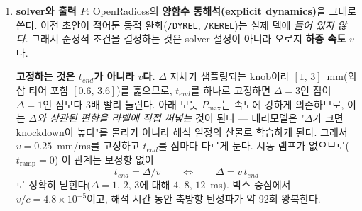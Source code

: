 \documentclass[11pt]{article}
\begin{document}
\begin{enumerate}
      비교 기준으로 쓰는 고전 임계값은 (선형 Donnell 이론, $\nu{=}0.3$)
      \[
        P_{cr} = 3.80276\,E\,t^2, \qquad
        \sigma_{cr} = 0.60523\,\frac{E\,t}{R}, \qquad
        d_{cr} = 0.60523\,\frac{t\,L}{R}
      \]
      이다. $P_{cr}$에서 $R$과 $L$이 정확히 상쇄된다는 점에 주의 --- 임계
      \emph{하중}은 두께만의 함수다. 설계 박스에서 $P_{cr}$은 798.6~kN
      ($t{=}1.0$)에서 3194.3~kN($t{=}2.0$)까지, 외삽 티어까지 포함하면
      511--4600~kN 범위다. 진단용 무차원수 $\lambda = \Delta/d_{cr}$는
      $0.44$--$3.49$에 분포한다. $\lambda$는 어디까지나 사후 진단량이고,
      샘플링을 좌우하지 않는다 --- 다섯 knob이 독립이므로 $\lambda$를 조건으로
      걸어 표본을 자르지 않는다.

      그 대가를 분명히 적어둔다: \textbf{모든 draw가 좌굴하지는 않는다}.
      학습 티어 draw의 16.7\%(25개 설계점, 1600 draw)가 $\lambda < 1$이고,
      39.3\%가 $\lambda < 1.2$다. 이런 draw는 부과한 스트로크가 끝날 때까지
      상승하는 탄성 경로 위에 머물러서, $P_{\max}$가 한계점 하중이 아니라
      \emph{스트로크 끝단의 하중}이다. 결정적으로 그 값은 \textbf{결함과
      무관하다} --- $\Delta{=}0.6$에서 서로 다른 딤플 draw 두 개가 비트 단위로
      동일한 $P_{\max}/P_{cr} = 0.442$를 돌려주었다. 따라서 이 경우
      $P_{\max}/P_{cr}$은 knockdown factor가 \emph{아니며}, 그렇게 읽으면 안
      된다. 각 draw는 한계점이 스트로크 내부에 있고($\Delta@P_{\max} <
      0.97\,\Delta$) 그 뒤로 하중이 떨어지는지($P_{\text{end}} <
      0.97\,P_{\max}$)를 판정한 불리언 \texttt{buckled} 플래그를 함께
      기록하므로, 소비자는 좌굴 라벨만 골라 쓸 수 있다.
\item \textbf{solver와 출력 $P$}: OpenRadioss의 \textbf{양함수 동해석(explicit
      dynamics)}을 그대로 쓴다. 이전 초안이 적어둔 동적 완화(\texttt{/DYREL},
      \texttt{/KEREL})는 실제 덱에 \emph{들어 있지 않다}. 그래서 준정적 조건을
      결정하는 것은 solver 설정이 아니라 오로지 \textbf{하중 속도} $v$다.

      \textbf{고정하는 것은 $t_{end}$가 아니라 $v$다.} $\Delta$ 자체가 샘플링되는
      knob이라 $[1,\,3]$~mm(외삽 티어 포함 $[0.6,\,3.6]$)를 훑으므로, $t_{end}$를
      하나로 고정하면 $\Delta{=}3$인 점이 $\Delta{=}1$인 점보다 3배 빨리 눌린다.
      아래 보듯 $P_{\max}$는 속도에 강하게 의존하므로, 이는 \emph{$\Delta$와
      상관된 편향을 라벨에 직접 써넣는} 것이 된다 --- 대리모델은 "$\Delta$가
      크면 knockdown이 높다"를 물리가 아니라 해석 일정의 산물로 학습하게 된다.
      그래서 $v = 0.25$~mm/ms를 고정하고 $t_{end}$를 점마다 다르게 둔다. 시동
      램프가 없으므로($t_\mathrm{ramp}{=}0$) 이 관계는 보정항 없이
      \[
        t_{end} = \Delta/v
        \qquad\Longleftrightarrow\qquad
        \Delta = v\,t_{end}
      \]
      로 정확히 닫힌다($\Delta{=}1,\,2,\,3$에 대해 $4,\,8,\,12$~ms).
      박스 중심에서 $v/c = 4.8\times10^{-5}$이고, 해석 시간 동안 축방향 탄성파가
      약 92회 왕복한다.


\end{enumerate}
\end{document}
